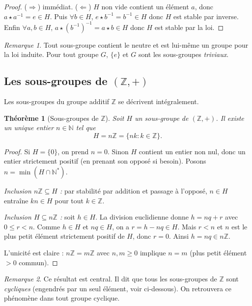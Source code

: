 \documentclass[12pt,a4paper]{report}
\newtheorem{theoreme}{Théorème}[section]
\theoremstyle{definition}
\theoremstyle{remark}
\newtheorem{remarque}{Remarque}[section]
\begin{document}
\begin{proof}
($\Rightarrow$) immédiat. ($\Leftarrow$) $H$ non vide contient un élément $a$, donc $a \star a^{-1} = e \in H$. Puis $\forall b \in H$, $e \star b^{-1} = b^{-1} \in H$ donc $H$ est stable par inverse. Enfin $\forall a, b \in H$, $a \star (b^{-1})^{-1} = a \star b \in H$ donc $H$ est stable par la loi.
\end{proof}

\begin{remarque}
Tout sous-groupe contient le neutre et est lui-même un groupe pour la loi induite. Pour tout groupe $G$, $\{e\}$ et $G$ sont les sous-groupes \emph{triviaux}.
\end{remarque}

\subsection{Les sous-groupes de $(\mathbb{Z}, +)$}

Les sous-groupes du groupe additif $\mathbb{Z}$ se décrivent intégralement.

\begin{theoreme}[Sous-groupes de $\mathbb{Z}$]
Soit $H$ un sous-groupe de $(\mathbb{Z}, +)$. Il existe un unique entier $n \in \mathbb{N}$ tel que
\[ H = n\mathbb{Z} = \{nk : k \in \mathbb{Z}\}. \]
\end{theoreme}

\begin{proof}
Si $H = \{0\}$, on prend $n = 0$. Sinon $H$ contient un entier non nul, donc un entier strictement positif (en prenant son opposé si besoin). Posons $n = \min(H \cap \mathbb{N}^*)$.

\emph{Inclusion $n\mathbb{Z} \subseteq H$ :} par stabilité par addition et passage à l'opposé, $n \in H$ entraîne $kn \in H$ pour tout $k \in \mathbb{Z}$.

\emph{Inclusion $H \subseteq n\mathbb{Z}$ :} soit $h \in H$. La division euclidienne donne $h = nq + r$ avec $0 \le r < n$. Comme $h \in H$ et $nq \in H$, on a $r = h - nq \in H$. Mais $r < n$ et $n$ est le plus petit élément strictement positif de $H$, donc $r = 0$. Ainsi $h = nq \in n\mathbb{Z}$.

L'unicité est claire : $n\mathbb{Z} = m\mathbb{Z}$ avec $n, m \ge 0$ implique $n = m$ (plus petit élément $> 0$ commun).
\end{proof}

\begin{remarque}
Ce résultat est central. Il dit que tous les sous-groupes de $\mathbb{Z}$ sont \emph{cycliques} (engendrés par un seul élément, voir ci-dessous). On retrouvera ce phénomène dans tout groupe cyclique.
\end{remarque}
\end{document}
